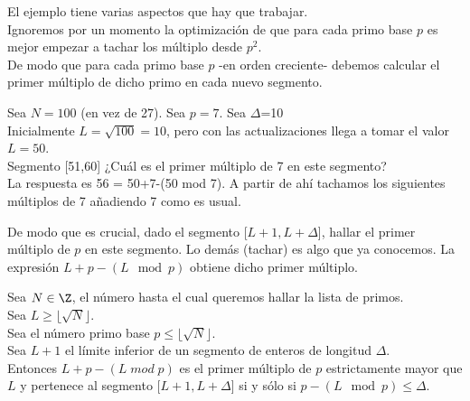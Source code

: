 El ejemplo tiene varias aspectos que hay que trabajar.\\
Ignoremos por un momento la optimización de que para cada primo base $p$ es mejor empezar a tachar los múltiplo desde $p^{2}$.\\
De modo que para cada primo base $p$ -en orden creciente- debemos calcular el primer múltiplo de dicho primo en cada nuevo segmento.

\begin{ejemplo}
Sea $N=100$ (en vez de 27). Sea $p=7$. Sea $\Delta$=10\\
Inicialmente $L = \sqrt{100} = 10$, pero con las actualizaciones llega a tomar el valor $L = 50$.\\
Segmento [51,60] ¿Cuál es el primer múltiplo de 7 en este segmento?\\
La respuesta es 56 = 50+7-(50 mod 7). A partir de ahí tachamos los siguientes múltiplos de 7 añadiendo 7 como es usual.
\end{ejemplo}

De modo que es crucial, dado el segmento [$L+1,L+\Delta$], hallar el primer múltiplo de $p$ en este segmento. Lo demás (tachar) es algo que ya conocemos. La expresión $L+p - (L \mod p)$ obtiene dicho primer múltiplo.

\begin{enunciado}\label{enun:1ermultiplosegmento}\leavevmode\par
Sea $N \in \Z$, el número hasta el cual queremos hallar la lista de primos.\\
Sea $L \geq \lfloor \sqrt{N} \rfloor$.\\
Sea el número primo base $p \leq \lfloor \sqrt{N} \rfloor$.\\ 
Sea $L+1$ el límite inferior de un segmento de enteros de longitud $\Delta$.\\
Entonces $L+p - (L \; mod \; p)$ es el primer múltiplo de $p$ estrictamente mayor que $L$ y pertenece al segmento [$L+1,L+\Delta$] si y sólo si $p-(L \mod p) \leq \Delta$.
\end{enunciado}

